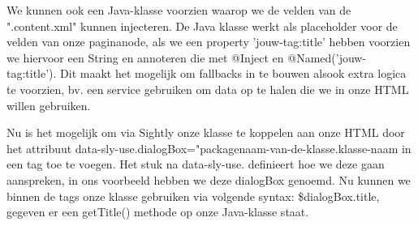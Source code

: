 	\par
	We kunnen ook een Java-klasse voorzien waarop we de velden van de ".content.xml" kunnen injecteren. De Java klasse werkt als placeholder voor de velden van onze paginanode, als we een property 'jouw-tag:title' hebben voorzien we hiervoor een String en annoteren die met @Inject en @Named('jouw-tag:title'). Dit maakt het mogelijk om fallbacks in te bouwen alsook extra logica te voorzien, bv. een service gebruiken om data op te halen die we in onze HTML willen gebruiken.  
	\par
	Nu is het mogelijk om via Sightly onze klasse te koppelen aan onze HTML door het attribuut \textquotedbl data-sly-use.dialogBox="packagenaam-van-de-klasse.klasse-naam\textquotedbl{} in een tag toe te voegen. Het stuk na \textquotedbl data-sly-use.\textquotedbl{} definieert hoe we deze gaan aanspreken, in ons voorbeeld hebben we deze dialogBox genoemd. Nu kunnen we binnen de tags onze klasse gebruiken via volgende syntax: \${dialogBox.title}, gegeven er een getTitle() methode op onze Java-klasse staat.
	